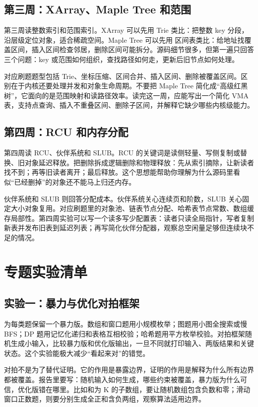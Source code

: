 \subsection{第三周：XArray、Maple Tree 和范围}

第三周读整数索引和范围索引。XArray 可以先用 Trie 类比：把整数 key 分段，沿层级定位对象，适合稀疏空间。Maple Tree 可以先用  区间表类比：给地址找覆盖区间，插入区间检查邻居，删除区间可能拆分。源码细节很多，但第一遍只回答三个问题：key 或范围如何组织，查找路径如何走，更新后旧节点如何处理。

对应刷题题型包括 Trie、坐标压缩、区间合并、插入区间、删除被覆盖区间。区别在于内核还要处理并发和对象生命周期。不要把 Maple Tree 简化成“高级红黑树”，它面向的是范围映射和读路径效率。读完这一周，应能写出一个简化 VMA 表，支持点查询、插入不重叠区间、删除子区间，并解释它缺少哪些内核级能力。

\subsection{第四周：RCU 和内存分配}

第四周读 RCU、伙伴系统和 SLUB。RCU 的关键词是读侧轻量、写侧复制或替换、旧对象延迟释放。把删除拆成逻辑删除和物理释放：先从索引摘除，让新读者找不到；再等旧读者离开；最后释放。这个思想能帮助你理解为什么源码里看似“已经删掉”的对象还不能马上归还内存。

伙伴系统和 SLUB 则回答分配成本。伙伴系统关心连续页和阶数，SLUB 关心固定大小对象复用。对应刷题里的对象池、链表节点分配、哈希表节点常数、数组缓存局部性。第四周实验可以写一个读多写少配置表：读者只读全局指针，写者复制新表并发布旧表到延迟列表；再写简化伙伴分配器，观察总空闲量足够但连续块不足的情况。

\section{专题实验清单}

\subsection{实验一：暴力与优化对拍框架}

为每类题保留一个暴力版。数组和窗口题用小规模枚举；图题用小图全搜索或慢 BFS；DP 题用记忆化递归和表格互相校验；哈希题用平方枚举校验。对拍框架随机生成小输入，比较暴力版和优化版输出，一旦不同就打印输入、两版结果和关键状态。这个实验能极大减少“看起来对”的错觉。

对拍不是为了替代证明。它的作用是暴露边界，证明的作用是解释为什么所有边界都被覆盖。报告里要写：随机输入如何生成，哪些约束被覆盖，暴力版为什么可信，优化版错在哪里。比如和为 K 的子数组，要让随机数组包含负数和零；滑动窗口正数题，则要分别生成全正和含负两组，观察算法适用边界。

